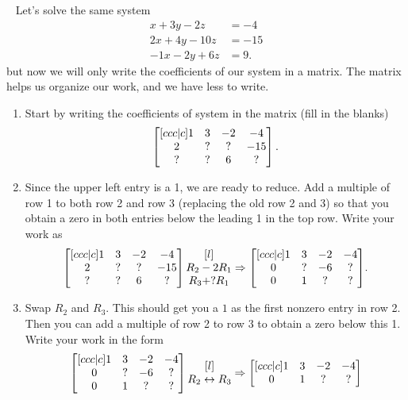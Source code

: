 \begin{problem}\
Let's solve the same system 
\begin{align*}
x+3y-2z&=-4 \\
2x+4y-10z&=-15 \\
-1x-2y+6z&=9. 
\end{align*}
but now we will only write the coefficients of our system in a matrix. The matrix helps us organize our work, and we have less to write. 
\begin{enumerate}
\item 
{} %
Start by writing the coefficients of system in the matrix (fill in the blanks) 
$$\begin{bmatrix} [ccc|c]
1 & 3 & -2 & -4 \\
2 & ? & ? & -15 \\
? & ? & 6  & ? \end{bmatrix}.
$$
\item 
{}
Since the upper left entry is a 1, we are ready to reduce.  Add a multiple of row 1 to both row 2 and row 3 (replacing the old row 2 and 3) so that you obtain a zero in both entries below the leading 1 in the top row. Write your work as
$$
\begin{matrix} \begin{bmatrix} [ccc|c]
1 & 3 & -2 & -4 \\
2 & ? & ? & -15 \\
? & ? & 6  & ? \end{bmatrix}
\begin{matrix} [l] \\ R_2-2R_1   \\ R_3+?R_1  \end{matrix}
 \end{matrix}
\Rightarrow
\begin{matrix} \begin{bmatrix} [ccc|c]
1 & 3 & -2 & -4 \\
0 & ? & -6 & ? \\
0 & 1 & ?  & ?  \end{bmatrix}
 \end{matrix}.
$$
 \item Swap $R_2$ and $R_3$. This should get you a $1$ as the first nonzero entry in row 2. Then you can add a multiple of row 2 to row 3 to obtain a zero below this 1. Write your work in the form 
$$
\begin{matrix} \begin{bmatrix} [ccc|c]
1 & 3 & -2 & -4 \\
0 & ? & -6 & ? \\
0 & 1 & ?  & ?  \end{bmatrix}
\begin{matrix} [l] \\ R_2\leftrightarrow R_3   \\   \end{matrix}
 \end{matrix}
\Rightarrow
\begin{matrix} \begin{bmatrix} [ccc|c]
1 & 3 & -2 & -4 \\
0 & 1 & ? & ? \\
 \end{bmatrix} \end{matrix}$$
\end{enumerate}
\end{problem}
